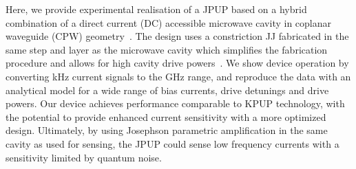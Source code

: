 Here, we provide experimental realisation of a JPUP based on a hybrid combination of a direct current (DC) accessible microwave cavity in coplanar waveguide (CPW) geometry~\cite{bosmanBroadbandArchitectureGalvanically2015c,schmidtBallisticGrapheneSuperconducting2018}.
% 
The design uses a constriction JJ fabricated in the same step and layer as the microwave cavity which simplifies the fabrication procedure and allows for high cavity drive powers~\cite{vijayOptimizingAnharmonicityNanoscale2009,kennedyTunableNbSuperconducting2019,rodriguesCouplingMicrowavePhotons2019,bothnerPhotonPressureStrongCouplingTwo2019}.
% 
We show device operation by converting \si{\kilo\hertz} current signals to the \si{\giga\hertz} range, and reproduce the data with an analytical model for a wide range of bias currents, drive detunings and drive powers.
%
Our device achieves performance comparable to KPUP technology, with the potential to provide enhanced current sensitivity with a more optimized design. Ultimately, by using Josephson parametric amplification in the same cavity as used for sensing, the JPUP could sense low frequency currents with a sensitivity limited by quantum noise.


